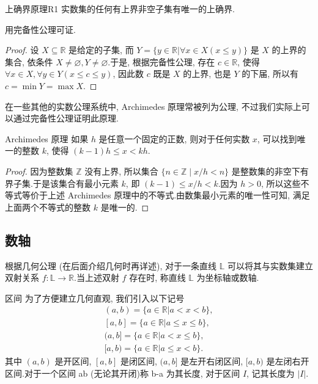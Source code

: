 \documentclass[cn,toc=twocol]{elegantbook}
\newcommand{\R}{\mathbb{R}}
\newcommand{\Z}{\mathbb{Z}}
\begin{document}
\begin{theorem}{上确界原理}{R1}
实数集的任何有上界非空子集有唯一的上确界.
\end{theorem}
\begin{idea*}
用完备性公理可证.	
\end{idea*}

\begin{proof}
	设 $X \subseteq \R$ 是给定的子集, 而 $Y = \{y\in\R | \forall x \in X (x \le y)\}$ 是 $X$ 的上界的集合, 依条件 $X\neq \varnothing,  Y\neq \varnothing$.于是, 根据完备性公理, 存在 $c \in \R$, 使得 $\forall x \in X, \forall y \in Y (x\le c\le y)$, 因此数 $c$ 既是 $X$ 的上界, 也是 $Y$ 的下届, 所以有 $c = \min Y = \max X$.
\end{proof}
\smallskip


在一些其他的实数公理系统中, Archimedes 原理常被列为公理, 不过我们实际上可以通过完备性公理证明此原理.

\begin{theorem}{Archimedes 原理}
	如果 $h$ 是任意一个固定的正数, 则对于任何实数 $x$, 可以找到唯一的整数 $k$, 使得 $(k-1)h\le x < kh$.
\end{theorem}
\begin{proof}
	因为整数集 $\Z$ 没有上界, 所以集合 $\{n\in\Z\mid x/h<n\}$ 是整数集的非空下有界子集.于是该集合有最小元素 $k$, 即 $(k-1) \le x/h < k$.因为 $h > 0$, 所以这些不等式等价于上述 Archimedes 原理中的不等式.由数集最小元素的唯一性可知, 满足上面两个不等式的整数 $k$ 是唯一的.
\end{proof}
\smallskip

\subsection{数轴}

根据几何公理 (在后面介绍几何时再详述), 对于一条直线 $\mathbb{L}$ 可以将其与实数集建立双射关系 $f:\mathbb{L} \to \R$.当上述双射 $f$ 存在时, 称直线 $\mathbb{L}$ 为坐标轴或数轴.

\begin{definition}{区间}
为了方便建立几何直观, 我们引入以下记号
\[
	\begin{aligned}
		(a, b) = \{a\in\R | a< x< b\},\\
		[a, b] = \{a\in\R | a\le x\le b\},\\
		(a, b] = \{a\in\R | a< x\le b\},\\
		[a, b) = \{a\in\R | a\le x< b\}.
	\end{aligned}
\]
其中 $(a, b)$ 是开区间, $[a, b]$ 是闭区间, $(a, b]$ 是左开右闭区间, $[a, b)$ 是左闭右开区间.对于一个区间 ab (无论其开闭)称 b-a 为其长度, 对于区间 $I$, 记其长度为 $\lvert I \rvert$.
\end{definition}
\end{document}
